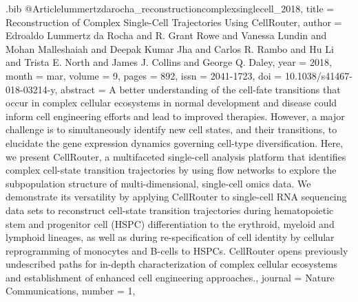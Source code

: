\documentclass[
  table,
  10pt,
  a4paper]{article}
\begin{document}
\begin{filecontents}{\jobname.bib}
@Article{lummertzdarocha_reconstructioncomplexsinglecell_2018,
	title = {Reconstruction of Complex Single-Cell Trajectories Using {{CellRouter}}},
	author = {Edroaldo {Lummertz da Rocha} and R. Grant Rowe and Vanessa Lundin and Mohan Malleshaiah and Deepak Kumar Jha and Carlos R. Rambo and Hu Li and Trista E. North and James J. Collins and George Q. Daley},
	year = {2018},
	month = {mar},
	volume = {9},
	pages = {892},
	issn = {2041-1723},
	doi = {10.1038/s41467-018-03214-y},
	abstract = {A better understanding of the cell-fate transitions that occur in complex cellular ecosystems in normal development and disease could inform cell engineering efforts and lead to improved therapies. However, a major challenge is to simultaneously identify new cell states, and their transitions, to elucidate the gene expression dynamics governing cell-type diversification. Here, we present CellRouter, a multifaceted single-cell analysis platform that identifies complex cell-state transition trajectories by using flow networks to explore the subpopulation structure of multi-dimensional, single-cell omics data. We demonstrate its versatility by applying CellRouter to single-cell RNA sequencing data sets to reconstruct cell-state transition trajectories during hematopoietic stem and progenitor cell (HSPC) differentiation to the erythroid, myeloid and lymphoid lineages, as well as during re-specification of cell identity by cellular reprogramming of monocytes and B-cells to HSPCs. CellRouter opens previously undescribed paths for in-depth characterization of complex cellular ecosystems and establishment of enhanced cell engineering approaches.},
	journal = {Nature Communications},
	number = {1},
}


\end{filecontents}
\end{document}
